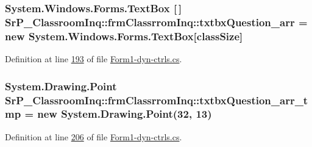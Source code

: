 \hypertarget{class_sr_p___classroom_inq_1_1frm_classrrom_inq_ac8b5f7f10341c6c43066881afcbbcaaa}{
\subsubsection[{txtbx\-Question\-\_\-arr}]{\setlength{\rightskip}{0pt plus 5cm}\-System.\-Windows.\-Forms.\-Text\-Box \mbox{[}$\,$\mbox{]} {\bf \-Sr\-P\-\_\-\-Classroom\-Inq\-::frm\-Classrrom\-Inq\-::txtbx\-Question\-\_\-arr} = new \-System.\-Windows.\-Forms.\-Text\-Box\mbox{[}{\bf class\-Size}\mbox{]}}}
\label{class_sr_p___classroom_inq_1_1frm_classrrom_inq_ac8b5f7f10341c6c43066881afcbbcaaa}


\-Definition at line \hyperlink{_form1-dyn-ctrls_8cs_source_l00193}{193} of file \hyperlink{_form1-dyn-ctrls_8cs_source}{\-Form1-\/dyn-\/ctrls.\-cs}.

\hypertarget{class_sr_p___classroom_inq_1_1frm_classrrom_inq_a09f25b6934ed463e8b781498b5511796}{
\subsubsection[{txtbx\-Question\-\_\-arr\-\_\-tmp}]{\setlength{\rightskip}{0pt plus 5cm}\-System.\-Drawing.\-Point {\bf \-Sr\-P\-\_\-\-Classroom\-Inq\-::frm\-Classrrom\-Inq\-::txtbx\-Question\-\_\-arr\-\_\-tmp} = new \-System.\-Drawing.\-Point(32, 13)}}
\label{class_sr_p___classroom_inq_1_1frm_classrrom_inq_a09f25b6934ed463e8b781498b5511796}


\-Definition at line \hyperlink{_form1-dyn-ctrls_8cs_source_l00206}{206} of file \hyperlink{_form1-dyn-ctrls_8cs_source}{\-Form1-\/dyn-\/ctrls.\-cs}.

